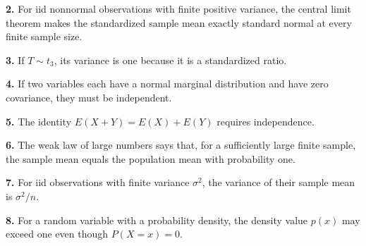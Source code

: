 \documentclass[11pt,a4paper]{article}
\begin{document}
\par\noindent\begin{minipage}{\linewidth}
\textbf{2.} For iid nonnormal observations with finite positive variance, the central limit theorem makes the standardized sample mean exactly standard normal at every finite sample size.
\end{minipage}\par\vspace{3mm}
\par\noindent\begin{minipage}{\linewidth}
\textbf{3.} If \(T\sim t_3\), its variance is one because it is a standardized ratio.
\end{minipage}\par\vspace{3mm}
\par\noindent\begin{minipage}{\linewidth}
\textbf{4.} If two variables each have a normal marginal distribution and have zero covariance, they must be independent.
\end{minipage}\par\vspace{3mm}
\par\noindent\begin{minipage}{\linewidth}
\textbf{5.} The identity \(E(X+Y)=E(X)+E(Y)\) requires independence.
\end{minipage}\par\vspace{3mm}
\par\noindent\begin{minipage}{\linewidth}
\textbf{6.} The weak law of large numbers says that, for a sufficiently large finite sample, the sample mean equals the population mean with probability one.
\end{minipage}\par\vspace{3mm}
\par\noindent\begin{minipage}{\linewidth}
\textbf{7.} For iid observations with finite variance \(\sigma^2\), the variance of their sample mean is \(\sigma^2/n\).
\end{minipage}\par\vspace{3mm}
\par\noindent\begin{minipage}{\linewidth}
\textbf{8.} For a random variable with a probability density, the density value \(p(x)\) may exceed one even though \(P(X=x)=0\).
\end{minipage}\par\vspace{3mm}
\end{document}
